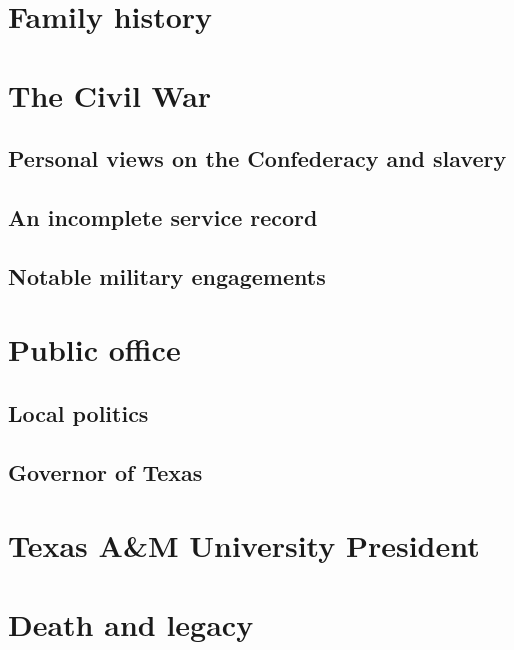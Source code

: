 \documentclass[12pt]{article}
\begin{document}
\newpage
\section{Family history}

\newpage
\section{The Civil War}

\subsection{Personal views on the Confederacy and slavery}

\subsection{An incomplete service record}

\subsection{Notable military engagements}

\newpage
\section{Public office}

\subsection{Local politics}

\subsection{Governor of Texas}

\newpage
\section{Texas A\&M University President}

\newpage
\section{Death and legacy}

\end{document}

